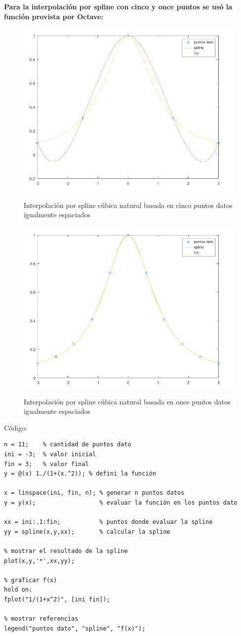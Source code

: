 \documentclass{article}
\begin{document}
\textbf{Para la interpolación por spline con cinco y once puntos se usó la función provista por Octave:}
\begin{figure}[H]
    \centering
    \includegraphics[width=0.5\linewidth]{spline.5.png}
    \label{fig:enter-label}
    \caption{Interpolación por spline cúbica natural basada en cinco puntos datos igualmente espaciados}
\end{figure}
\begin{figure}[H]
    \centering
    \includegraphics[width=0.5\linewidth]{spline.11.png}
    \label{fig:enter-label}
    \caption{Interpolación por spline cúbica natural basada en once puntos datos igualmente espaciados}
\end{figure}

Código:

\begin{lstlisting}
n = 11;    % cantidad de puntos dato
ini = -3;  % valor inicial
fin = 3;   % valor final
y = @(x) 1./(1+(x.^2)); % defini la función

x = linspace(ini, fin, n); % generar n puntos datos
y = y(x);                  % evaluar la función en los puntos dato

xx = ini:.1:fin;           % puntos donde evaluar la spline
yy = spline(x,y,xx);       % calcular la spline

% mostrar el resultado de la spline
plot(x,y,'*',xx,yy);

% graficar f(x)
hold on;
fplot("1/(1+x^2)", [ini fin]);

% mostrar referencias
legend("puntos dato", "spline", "f(x)");

\end{lstlisting}
\end{document}
